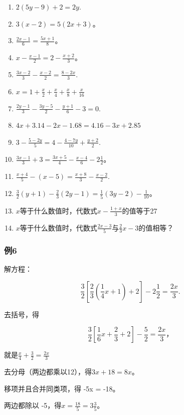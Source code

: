 \begin{enumerate}[start=1]
\item
  \(2(5y-9)+2=2y.\)
\item
  \(3(x-2)=5(2x+3)\)。
\item
  \(\frac{2x - 1}{6} = \frac{5x + 1}{8}\)。
\item
  \(x - \frac{x - 1}{2} = 2 - \frac{x + 2}{3}\)。
\item
  \(\frac{3x - 2}{3} -\frac{x - 2}{2} = \frac{8 - 2x}{3}.\)
\item
  \(x = 1 + \frac{x}{2} +\frac{x}{4} +\frac{x}{8} +\frac{x}{16}\)
\item
  \(\frac{2y - 1}{3} -\frac{3y - 5}{2} -\frac{y + 1}{6} -3 = 0.\)
\item
  \(4x+3.14-2x-1.68=4.16-3x+2.85\)
\item
  \(3 - \frac{5 - 2y}{5} = 4 - \frac{4 - 7y}{10} + \frac{y + 2}{2}.\)
\item
  \(\frac{3x - 1}{3} + 3 = \frac{3x + 5}{4} - \frac{x - 4}{6} - 2\frac{1}{2}\)。
\item
  \(\frac{x + 4}{5} -(x - 5) = \frac{x + 8}{3} -\frac{x - 2}{2}.\)
\item
  \(\frac{3}{2} (y + 1) - \frac{2}{3} (2y - 1) = \frac{1}{5} (3y - 2) - \frac{1}{10}\)。
\item
  \(x\)等于什么数值时，代数式\(x - \frac{1 + x}{3}\)的值等于27
\item
  \(x\)等于什么数值时，代数式\(\frac{2x - 3}{5}\)与\(\frac{2}{3} x - 3\)的值相等？
\end{enumerate}

\subsubsection{例6}

解方程：

\[
\frac{3}{2}\left[ \frac{2}{3} \left(\frac{1}{4} x + 1\right) + 2 \right] - 2 \frac{1}{2} = \frac{2 x}{3}.
\]

 去括号，得

\[
\frac{3}{2} \left[ \frac{1}{6} x + \frac{2}{3} + 2 \right] - \frac{5}{2} = \frac{2 x}{3}\text{，}
\]

就是\(\frac{x}{4} +\frac{3}{2} = \frac{2x}{3}\)

去分母（两边都乘以12），得\(3x+18=8x\)。

移项并且合并同类项，得 -5x = -18。

两边都除以 -5，得\(x=\frac{18}{5}=3\frac{3}{5}\)。

